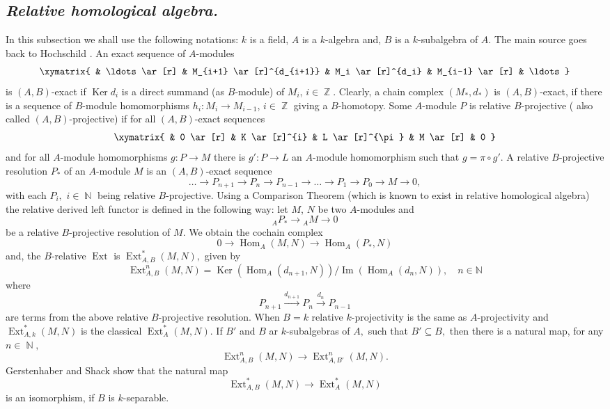 \documentclass[pdflatex,sn-mathphys-num]{sn-jnl}
\numberwithin{equation}{section}
\theoremstyle{thmstyleone}
\theoremstyle{thmstyletwo}
\theoremstyle{thmstylethree}
\newcommand{\Ker}{\operatorname{Ker}}
\newcommand{\Ext}{\operatorname{Ext}}
\newcommand{\Hom}{\operatorname{Hom}}
\newcommand{\Z}{\operatorname{\mathbb{Z}}}
\newcommand{\N}{\operatorname{\mathbb{N}}}
\begin{document}
\subsection{\textit{Relative homological algebra.}}\label{subsec23}
In this subsection we shall use the following notations: $k$ is a field, $A$ is a $k$-algebra and, $B$ is  a $k$-subalgebra of $A.$ The main source goes back to Hochschild \cite[Section 2]{Ho}. An exact sequence of $A$-modules
$$
\xymatrix{
& \ldots \ar[r]
& M_{i+1} \ar[r]^{d_{i+1}}
& M_i \ar[r]^{d_i}
& M_{i-1} \ar[r]
& \ldots
}$$
is $(A,B)$-exact if $\Ker d_i$ is a direct summand (as $B$-module) of $M_i$, $i\in \Z.$ Clearly, a chain complex $(M_*,d_*)$ is $(A,B)$-exact, if there is a sequence of $B$-module homomorphisms $h_i:M_i\rightarrow M_{i-1}$, $i \in \Z$ giving a $B$-homotopy. Some $A$-module $P$ is relative $B$-projective ( also called $(A,B)$-projective) if for all $(A,B)$-exact sequences
$$
\xymatrix{
& 0 \ar[r]
& K \ar[r]^{i}
& L \ar[r]^{\pi}
& M \ar[r]
& 0
}$$ and for all $A$-module homomorphisms $g:P\rightarrow M$ there is $g':P\rightarrow L$ an $A$-module homomorphism such that $g=\pi \circ g'.$
A relative $B$-projective resolution $P_{*}$ of an $A$-module $M$ is an $(A,B)$-exact sequence
$$\dots \rightarrow P_{n+1}\rightarrow P_n\rightarrow P_{n-1}\rightarrow \dots \rightarrow P_1\rightarrow P_0\rightarrow M\rightarrow 0,$$
with each $P_i,$ $i\in \N$ being relative $B$-projective. Using a Comparison Theorem (which is known to exist in relative homological algebra) the relative derived left functor is defined in the following way: let $M$, $N$ be two $A$-modules and $${}_AP_{*}\rightarrow {}_AM\rightarrow 0$$ be a relative $B$-projective resolution of $M$. We obtain the cochain complex
$$0\rightarrow\Hom_A(M,N)\rightarrow\Hom_A(P_*,N)$$
and, the $B$-relative $\Ext$ is $\Ext_{A,B}^*(M,N),$ given by
$$
\Ext_{A,B}^n(M,N)
= \Ker(\Hom_A(d_{n+1},N)) / \operatorname{Im}(\Hom_A(d_n,N)),
\quad n \in \mathbb{N}
$$
where
$$
P_{n+1} \xrightarrow{d_{n+1}} P_n \xrightarrow{d_n} P_{n-1}
$$
are terms from the above relative $B$-projective resolution.
When $B=k$ relative $k$-projectivity is the same as $A$-projectivity and $\Ext_{A,k}^*(M,N)$ is the classical $\Ext_A^*(M,N).$
If $B'$ and $B$ ar $k$-subalgebras of $A,$ such that $B'\subseteq B,$ then there is a natural map, for any $n\in \N,$
\begin{equation} \label{eqSha1}
\Ext_{A,B}^n(M,N)\rightarrow \Ext_{A,B'}^n(M,N).
\end{equation}
Gerstenhaber and Shack \cite[Theorem 1.2]{GeSc} show that the natural map
\begin{equation} \label{eqSha2}
\Ext_{A,B}^*(M,N)\rightarrow \Ext_{A}^*(M,N)
\end{equation}
is an isomorphism, if $B$ is $k$-separable.
\end{document}
